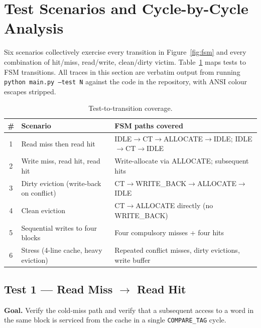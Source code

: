 \documentclass[11pt,a4paper]{article}
\begin{document}
\section{Test Scenarios and Cycle-by-Cycle Analysis}\label{sec:tests}

Six scenarios collectively exercise every transition in Figure~\ref{fig:fsm}
and every combination of hit/miss, read/write, clean/dirty victim.
Table~\ref{tab:coverage} maps tests to FSM transitions. All traces in this
section are verbatim output from running \texttt{python main.py --test N}
against the code in the repository, with ANSI colour escapes stripped.

\begin{table}[h]
    \centering
    \caption{Test-to-transition coverage.}
    \label{tab:coverage}
    \begin{tabular}{@{}clp{8.2cm}@{}}
        \toprule
        \textbf{\#} & \textbf{Scenario} & \textbf{FSM paths covered} \\
        \midrule
        1 & Read miss then read hit                & IDLE$\to$CT$\to$ALLOCATE$\to$IDLE; IDLE$\to$CT$\to$IDLE \\
        2 & Write miss, read hit, read hit         & Write-allocate via ALLOCATE; subsequent hits \\
        3 & Dirty eviction (write-back on conflict)& CT$\to$WRITE\_BACK$\to$ALLOCATE$\to$IDLE \\
        4 & Clean eviction                         & CT$\to$ALLOCATE directly (no WRITE\_BACK) \\
        5 & Sequential writes to four blocks       & Four compulsory misses + four hits \\
        6 & Stress (4-line cache, heavy eviction)  & Repeated conflict misses, dirty evictions, write buffer \\
        \bottomrule
    \end{tabular}
\end{table}

\subsection{Test 1 — Read Miss $\to$ Read Hit}

\textbf{Goal.} Verify the cold-miss path and verify that a subsequent access
to a word in the same block is serviced from the cache in a single
\texttt{COMPARE\_TAG} cycle.
\end{document}
